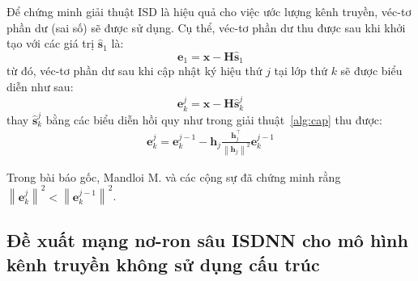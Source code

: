 Để chứng minh giải thuật ISD là hiệu quả cho việc ước lượng kênh truyền, véc-tơ phần dư (sai số) sẽ được sử dụng. Cụ thể, véc-tơ phần dư thu được sau khi khởi tạo với các giá trị $\hat{\mathbf{s}}_1$ là:
\begin{equation}
    \mathbf{e}_1 = \mathbf{x} - \mathbf{H} \hat{\mathbf{s}}_1
\end{equation}
từ đó, véc-tơ phần dư sau khi cập nhật ký hiệu thứ $j$ tại lớp thứ $k$ sẽ được biểu diễn như sau:
\begin{equation}
    \mathbf{e}_k^{j}=\mathbf{x}-\mathbf{H} \hat{\mathbf{s}}_k^j
\end{equation}
thay $\hat{\mathbf{s}}_k^j$ bằng các biểu diễn hồi quy như trong giải thuật~\ref{alg:cap} thu được:
\begin{equation}
\label{eq:eupdate}
\begin{aligned}
    \mathbf{e}_k^{j} =\mathbf{e}_k^{j-1}-\mathbf{h}_{j} \frac{\mathbf{h}_j^\top}{\left\|\mathbf{h}_j\right\|^2} \mathbf{e}_k^{j-1}
    \end{aligned}
\end{equation}

Trong bài báo gốc, Mandloi M. và các cộng sự đã chứng minh rằng $\left\|\mathbf{e}_k^{j}\right\|^2<\left\|\mathbf{e}_k^{j-1}\right\|^2$. 

\subsection{Đề xuất mạng nơ-ron sâu ISDNN cho mô hình kênh truyền không sử dụng cấu trúc}
\label{sec:ISNN_nonstructured}

